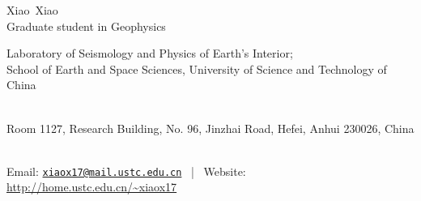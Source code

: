 \documentclass[11pt, a4paper]{article}
\makeatletter
\newcommand{\FirstName}{Xiao}
\newcommand{\LastName}{Xiao}
\newcommand{\MyName}{\FirstName\ \LastName}
\newcommand{\MyRole}{Graduate student in Geophysics}
\newcommand{\Email}{xiaox17@mail.ustc.edu.cn}
\newcommand{\Website}{http://home.ustc.edu.cn/~xiaox17}
\newcommand{\Affiliation}{
    Laboratory of Seismology and Physics of Earth's Interior; \\
    School of Earth and Space Sciences,
    University of Science and Technology of China
}
\newcommand{\Address}{
    Room 1127, Research Building, No. 96, Jinzhai Road, Hefei, Anhui 230026, China
}
\newcommand{\makefield}[2]{\makebox[1.5em]{\color{MarkerColour!80!black}#1} #2}
\makeatother
\begin{document}
\thispagestyle{empty}

\begin{center}
    {\fontsize{36pt}{0}\selectfont \MyName}
    \\[0.5cm]
    {\fontsize{16pt}{0}\selectfont \MyRole}
    \\[0.3cm]
    {\fontsize{10pt}{0}\selectfont
        \Affiliation
        \\[0.2cm]
        \Address
        \\[0.08cm]
        Email: \href{mailto:\Email}{\texttt{\Email}}
        \, | \,
        Website: \url{\Website}
    }
\end{center}








%

%
\end{document}
